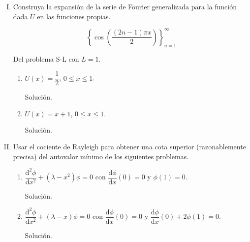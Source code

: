 \documentclass[fleqn]{article}
\newcommand{\despar}[3]{\dfrac{\mathrm{d}^#1 #2}{\mathrm{d} #3^#1}}
\newcommand{\depar}[2]{\dfrac{\mathrm{d} #1}{\mathrm{d} #2}}
\begin{document}
\begin{enumerate}[I.]
\begin{enumerate}
		\end{enumerate}


		\bfseries
			
		\item Construya la expansión de la serie de Fourier generalizada para la función dada $U$ en las funciones propias.
		
		\begin{equation*}
			\left\lbrace \cos \left( \dfrac{(2n - 1) \pi x}{2} \right) \right\rbrace_{n=1}^{\infty}
		\end{equation*}

		Del problema S-L con $ L = 1 $.
		
		\begin{enumerate}
			\item $ U(x) = \dfrac{1}{2} $, $ 0 \leq x \leq 1 $.
			
			Solución.
			
			\normalfont




			\bfseries
			
			\item $ U(x) = x + 1 $, $ 0 \leq x \leq 1 $.
			
			Solución.
			
			\normalfont



		\end{enumerate}
		

		\bfseries
			
		\item Usar el cociente de Rayleigh para obtener una cota superior (razonablemente precisa) del autovalor mínimo de los siguientes problemas.
		
		\begin{enumerate}
			\item $ \despar{2}{\phi}{x} + (\lambda - x^2) \phi = 0 $ con $ \depar{\phi}{x} (0) = 0 $ y $ \phi (1) = 0 $.
			
			Solución.
			
			\normalfont




			\bfseries
			
			\item $ \despar{2}{\phi}{x} + (\lambda - x) \phi = 0 $ con $ \depar{\phi}{x} (0) = 0 $ y $ \depar{\phi}{x} (0) + 2 \phi (1) = 0 $.
			
			Solución.
			
			\normalfont



		\end{enumerate}
	\end{enumerate}
\end{document}
